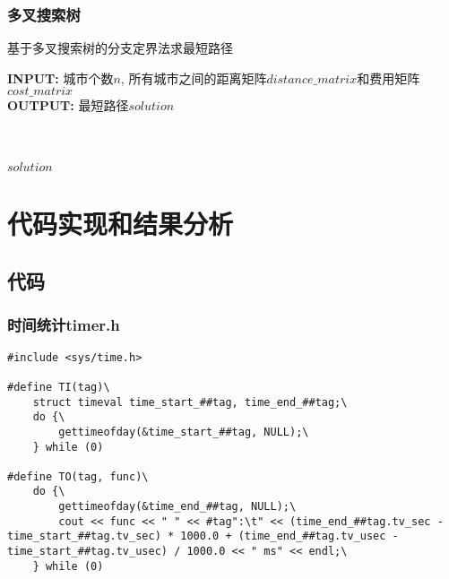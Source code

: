 \documentclass{article}
\begin{document}
	\subsubsection{多叉搜索树}
		\begin{algorithm}[H]
			\centering
			\caption{基于多叉搜索树的分支定界法求最短路径}
			\begin{flushleft}
				\textbf{INPUT:} 城市个数$n$, 所有城市之间的距离矩阵$distance\_matrix$和费用矩阵$cost\_matrix$\\
				\textbf{OUTPUT:} 最短路径$solution$
			\end{flushleft}
			\begin{algorithmic}[1]
				\Else
				\EndIf
				\EndIf
				\EndFor
				\EndFunction\\
				\EndFor
				\\
				\Return $solution$
			\end{algorithmic}
		\end{algorithm}

	\section{代码实现和结果分析}
	\subsection{代码}
	\subsubsection{时间统计timer.h}
\begin{lstlisting}
#include <sys/time.h>

#define TI(tag)\
    struct timeval time_start_##tag, time_end_##tag;\
    do {\
        gettimeofday(&time_start_##tag, NULL);\
    } while (0)

#define TO(tag, func)\
    do {\
        gettimeofday(&time_end_##tag, NULL);\
        cout << func << " " << #tag":\t" << (time_end_##tag.tv_sec - time_start_##tag.tv_sec) * 1000.0 + (time_end_##tag.tv_usec - time_start_##tag.tv_usec) / 1000.0 << " ms" << endl;\
    } while (0)
\end{lstlisting}
\end{document}
